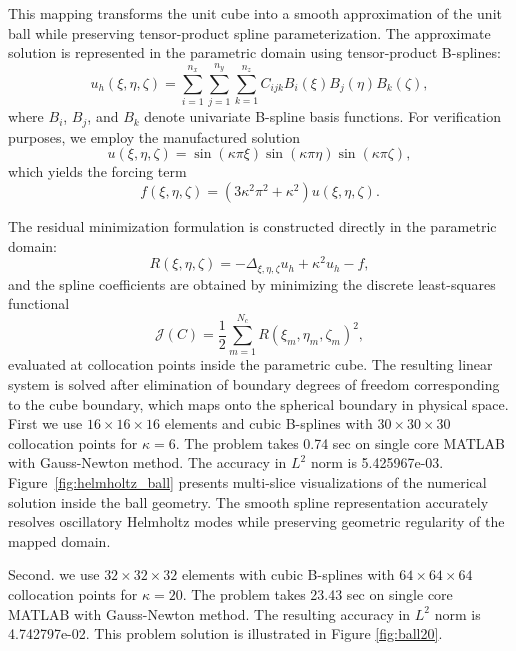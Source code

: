 \documentclass[review]{elsarticle}
\begin{document}
This mapping transforms the unit cube into a smooth approximation of the unit ball while preserving tensor-product spline parameterization.
The approximate solution is represented in the parametric domain using tensor-product B-splines:
\begin{equation}
u_h(\xi,\eta,\zeta)
=
\sum_{i=1}^{n_x}
\sum_{j=1}^{n_y}
\sum_{k=1}^{n_z}
C_{ijk}
B_i(\xi)
B_j(\eta)
B_k(\zeta),
\end{equation}
where $B_i$, $B_j$, and $B_k$ denote univariate B-spline basis functions.
For verification purposes, we employ the manufactured solution
\begin{equation}
u(\xi,\eta,\zeta)
=
\sin(\kappa\pi\xi)
\sin(\kappa\pi\eta)
\sin(\kappa\pi\zeta),
\end{equation}
which yields the forcing term
\begin{equation}
f(\xi,\eta,\zeta)
=
\left(
3\kappa^2\pi^2+\kappa^2
\right)
u(\xi,\eta,\zeta).
\end{equation}

The residual minimization formulation is constructed directly in the parametric domain:
\begin{equation}
R(\xi,\eta,\zeta)
=
-\Delta_{\xi,\eta,\zeta} u_h
+
\kappa^2 u_h
-
f,
\end{equation}
and the spline coefficients are obtained by minimizing the discrete least-squares functional
\begin{equation}
\mathcal{J}(C)
=
\frac12
\sum_{m=1}^{N_c}
R(\xi_m,\eta_m,\zeta_m)^2,
\end{equation}
evaluated at collocation points inside the parametric cube.
The resulting linear system is solved after elimination of boundary degrees of freedom corresponding to the cube boundary, which maps onto the spherical boundary in physical space.
First we use $16\times 16\times 16$ elements and cubic B-splines with $30\times 30\times 30$ collocation points for $\kappa=6$. The problem takes 0.74 sec on single core MATLAB with Gauss-Newton method. The accuracy in $L^2$ norm is 5.425967e-03. 
Figure~\ref{fig:helmholtz_ball} presents multi-slice visualizations of the numerical solution inside the ball geometry. The smooth spline representation accurately resolves oscillatory Helmholtz modes while preserving geometric regularity of the mapped domain.

Second. we use $32\times 32\times 32$ elements with cubic B-splines with $64\times 64 \times 64$ collocation points for $\kappa=20$. The problem takes 23.43 sec on single core MATLAB with Gauss-Newton method. The resulting accuracy in $L^2$ norm is 4.742797e-02. This problem solution is illustrated in Figure \ref{fig:ball20}.
\end{document}
